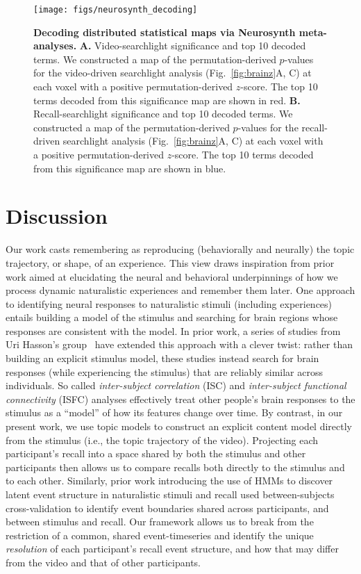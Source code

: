 \documentclass{article}
\begin{document}
\begin{figure}[t]
\centering
\texttt{[image: figs/neurosynth\_decoding]}
\caption{\small \textbf{Decoding distributed statistical maps via Neurosynth meta-analyses.} \textbf{A.} Video-searchlight significance and top 10 decoded terms.  We constructed a map of the permutation-derived $p$-values for the video-driven searchlight analysis (Fig.~\ref{fig:brainz}A, C) at each voxel with a positive permutation-derived $z$-score.  The top 10 terms decoded from this significance map are shown in red.  \textbf{B.} Recall-searchlight significance and top 10 decoded terms.  We constructed a map of the permutation-derived $p$-values for the recall-driven searchlight analysis (Fig.~\ref{fig:brainz}A, C) at each voxel with a positive permutation-derived $z$-score.  The top 10 terms decoded from this significance map are shown in blue.}
\label{fig:neurosynth}
\end{figure}
\FloatBarrier


\section*{Discussion}
\label{sec:discussion}

Our work casts remembering as reproducing (behaviorally and neurally) the topic trajectory, or shape, of an experience.  This view draws inspiration from prior work aimed at elucidating the neural and behavioral underpinnings of how we process dynamic naturalistic experiences and remember them later.  One approach to identifying neural responses to naturalistic stimuli (including experiences) entails building a model of the stimulus and searching for brain regions whose responses are consistent with the model.  In prior work, a series of studies from Uri Hasson's group~\citep{LernEtal11, SimoEtal16, ChenEtal17, BaldEtal17, ZadbEtal17} have extended this approach with a clever twist: rather than building an explicit stimulus model, these studies instead search for brain responses (while experiencing the stimulus) that are reliably similar across individuals.  So called \textit{inter-subject correlation} (ISC) and \textit{inter-subject functional connectivity} (ISFC) analyses effectively treat other people's brain responses to the stimulus as a ``model'' of how its features change over time.  By contrast, in our present work, we use topic models to construct an explicit content model directly from the stimulus (i.e., the topic trajectory of the video).  Projecting each participant's recall into a space shared by both the stimulus and other participants then allows us to compare recalls both directly to the stimulus and to each other.  Similarly, prior work introducing the use of HMMs to discover latent event structure in naturalistic stimuli and recall \citep{BaldEtal17} used between-subjects cross-validation to identify event boundaries shared across participants, and between stimulus and recall.  Our framework allows us to break from the restriction of a common, shared event-timeseries and identify the unique \textit{resolution} of each participant's recall event structure, and how that may differ from the video and that of other participants.
\end{document}

